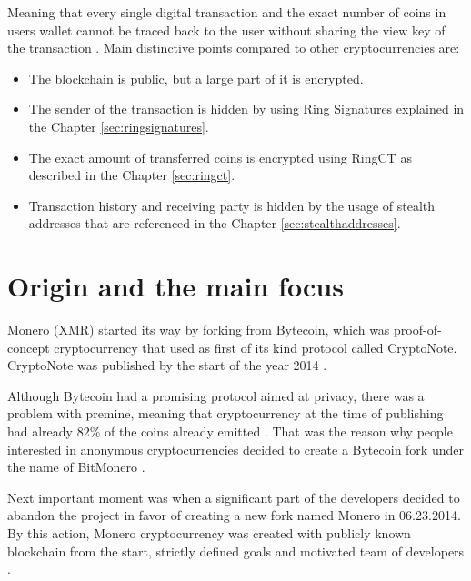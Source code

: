 \documentclass[
  printed, %
  table,   %
  lof,     %
  lot,     %
           oneside, color
]{fithesis3}
\begin{document}
Meaning that every single digital transaction and the exact number of coins in users wallet cannot be traced back to the user without sharing the view key of the transaction \cite{moneroprojectgithub}. Main distinctive points compared to other cryptocurrencies are:

\begin{itemize}\itemsep0em
\item The blockchain is public, but a large part of it is encrypted.
\item The sender of the transaction is hidden by using Ring Signatures explained in the Chapter \ref{sec:ringsignatures}.
\item The exact amount of transferred coins is encrypted using RingCT as described in the Chapter \ref{sec:ringct}.
\item Transaction history and receiving party is hidden by the usage of stealth addresses that are referenced in the Chapter \ref{sec:stealthaddresses}.
\end{itemize}

\section{Origin and the main focus}
Monero (XMR) started its way by forking from Bytecoin, which was proof-of-concept cryptocurrency that used as first of its kind protocol called CryptoNote. CryptoNote was published by the start of the year 2014 \cite{githubbytecoin}.

Although Bytecoin had a promising protocol aimed at privacy, there was a problem with premine, meaning that cryptocurrency at the time of publishing had already 82\% of the coins already emitted \cite{fluffyponyonbytecoin}. That was the reason why people interested in anonymous cryptocurrencies decided to create a Bytecoin fork under the name of BitMonero \cite{bitmonero}. 

Next important moment was when a significant part of the developers decided to abandon the project in favor of creating a new fork named Monero in 06.23.2014. By this action, Monero cryptocurrency was created with publicly known blockchain from the start, strictly defined goals and motivated team of developers \cite{monerofork}.

\end{document}
